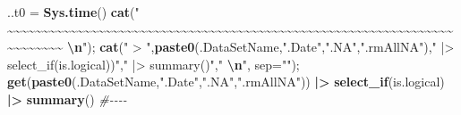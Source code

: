 \documentclass[
]{article}
\newenvironment{Shaded}{\begin{snugshade}}{\end{snugshade}}
\newcommand{\AttributeTok}[1]{\textcolor[rgb]{0.13,0.29,0.53}{#1}}
\newcommand{\CommentTok}[1]{\textcolor[rgb]{0.56,0.35,0.01}{\textit{#1}}}
\newcommand{\FunctionTok}[1]{\textcolor[rgb]{0.13,0.29,0.53}{\textbf{#1}}}
\newcommand{\NormalTok}[1]{#1}
\newcommand{\OtherTok}[1]{\textcolor[rgb]{0.56,0.35,0.01}{#1}}
\newcommand{\SpecialCharTok}[1]{\textcolor[rgb]{0.81,0.36,0.00}{\textbf{#1}}}
\newcommand{\StringTok}[1]{\textcolor[rgb]{0.31,0.60,0.02}{#1}}
\begin{document}
\begin{Shaded}
\begin{Highlighting}[]
\NormalTok{..t0 }\OtherTok{=} \FunctionTok{Sys.time}\NormalTok{()}
\FunctionTok{cat}\NormalTok{(}\StringTok{"    \textasciitilde{}\textasciitilde{}\textasciitilde{}\textasciitilde{}\textasciitilde{}\textasciitilde{}\textasciitilde{}\textasciitilde{}\textasciitilde{}\textasciitilde{}\textasciitilde{}\textasciitilde{}\textasciitilde{}\textasciitilde{}\textasciitilde{}\textasciitilde{}\textasciitilde{}\textasciitilde{}\textasciitilde{}\textasciitilde{}\textasciitilde{}\textasciitilde{}\textasciitilde{}\textasciitilde{}\textasciitilde{}\textasciitilde{}\textasciitilde{}\textasciitilde{}\textasciitilde{}\textasciitilde{}\textasciitilde{}\textasciitilde{}\textasciitilde{}\textasciitilde{}\textasciitilde{}\textasciitilde{}\textasciitilde{}\textasciitilde{}\textasciitilde{}\textasciitilde{}\textasciitilde{}\textasciitilde{}\textasciitilde{}\textasciitilde{}\textasciitilde{}\textasciitilde{}\textasciitilde{}\textasciitilde{}\textasciitilde{}\textasciitilde{}\textasciitilde{}\textasciitilde{}\textasciitilde{}\textasciitilde{}\textasciitilde{}\textasciitilde{}\textasciitilde{}\textasciitilde{}\textasciitilde{}\textasciitilde{}\textasciitilde{}\textasciitilde{}\textasciitilde{}\textasciitilde{}\textasciitilde{}\textasciitilde{}\textasciitilde{}\textasciitilde{}\textasciitilde{}\textasciitilde{}\textasciitilde{}\textasciitilde{}    }\SpecialCharTok{\textbackslash{}n}\StringTok{"}\NormalTok{); }\FunctionTok{cat}\NormalTok{(}\StringTok{" \textgreater{} "}\NormalTok{,}\FunctionTok{paste0}\NormalTok{(.DataSetName,}\StringTok{".Date"}\NormalTok{,}\StringTok{".NA"}\NormalTok{,}\StringTok{".rmAllNA"}\NormalTok{),}\StringTok{" |\textgreater{} select\_if(is.logical))"}\NormalTok{,}\StringTok{" |\textgreater{} summary()"}\NormalTok{,}\StringTok{"  }\SpecialCharTok{\textbackslash{}n}\StringTok{"}\NormalTok{, }\AttributeTok{sep=}\StringTok{""}\NormalTok{); }\FunctionTok{get}\NormalTok{(}\FunctionTok{paste0}\NormalTok{(.DataSetName,}\StringTok{".Date"}\NormalTok{,}\StringTok{".NA"}\NormalTok{,}\StringTok{".rmAllNA"}\NormalTok{)) }\SpecialCharTok{|\textgreater{}} \FunctionTok{select\_if}\NormalTok{(is.logical) }\SpecialCharTok{|\textgreater{}} \FunctionTok{summary}\NormalTok{() }\CommentTok{\#{-}{-}{-}{-}  }

\end{Highlighting}
\end{Shaded}
\end{document}
